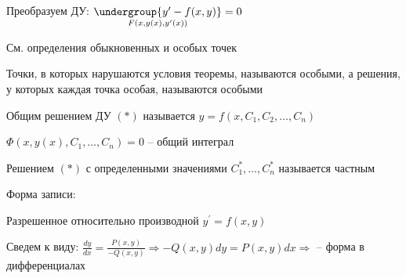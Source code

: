 \documentclass[12pt]{article}
\begin{document}
    \Nota Преобразуем ДУ: $\underset{F(x, y(x), y^\prime(x))}{\undergroup{y^\prime - f(x, y)}} = 0$

    См. определения обыкновенных и особых точек

     Точки, в которых нарушаются условия теоремы, называются особыми, а решения, у которых каждая точка особая,
    называются особыми

     Общим решением ДУ $(*)$ называется $y = f(x, C_1, C_2, \dots, C_n)$

    \Notas $\Phi(x, y(x), C_1, \dots, C_n) = 0$ -- общий интеграл

     Решением $(*)$ с определенными значениями $C_1^*, \dots, C_n^*$ называется частным

    \Nota Форма записи:

    Разрешенное относительно производной $y^\prime = f(x, y)$

    Сведем к виду: $\frac{dy}{dx} = \frac{P(x, y)}{-Q(x, y)} \Longrightarrow -Q(x, y)dy = P(x, y)dx \Longrightarrow $
     -- форма в дифференциалах
\end{document}
